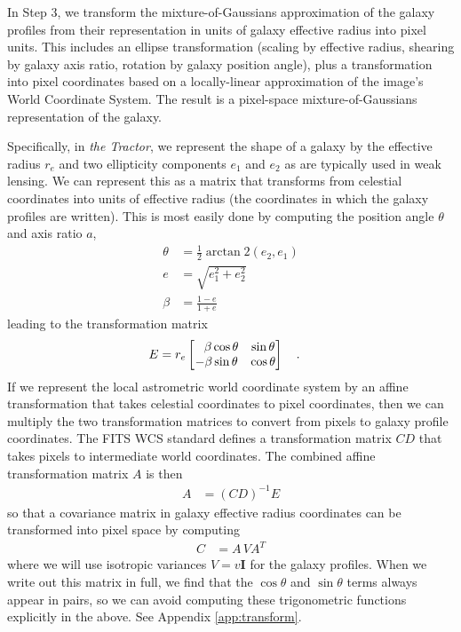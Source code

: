 \documentclass[11pt,preprint]{aastex}
\newcommand{\appref}[1]{Appendix \ref{#1}}
\newcommand{\project}[1]{\textsl{#1}}
\newcommand{\transpose}[1]{#1^{T}}
\newcommand{\CD}{C\!D}
\begin{document}
In Step 3, we transform the mixture-of-Gaussians approximation of the
galaxy profiles from their representation in units of galaxy effective
radius into pixel units.  This includes an ellipse transformation
(scaling by effective radius, shearing by galaxy axis ratio, rotation
by galaxy position angle), plus a transformation into pixel
coordinates based on a locally-linear approximation of the image's
World Coordinate System.
The result is a pixel-space mixture-of-Gaussians representation of the
galaxy.

Specifically, in \project{the Tractor}, we represent the shape of a
galaxy by the effective radius $r_e$ and two ellipticity components
$e_1$ and $e_2$ as are typically used in weak lensing.  We can
represent this as a matrix that transforms from celestial coordinates
into units of effective radius (the coordinates in which the galaxy
profiles are written).  This is most easily done by computing the
position angle $\theta$ and axis ratio $a$,
\begin{align}
%
\theta & = \frac{1}{2} \arctan\!2(e_2, e_1) \\
%
e & = \sqrt{e_1^2 + e_2^2} \\
%
\beta & = \frac{1 - e}{1 + e} \label{eq:a}
\end{align}
leading to the transformation matrix
\begin{align}
E &= r_e \begin{bmatrix}
\textcolor{white}{-}\beta \cos{\theta} & \sin{\theta} \\
-\beta \sin{\theta} & \cos{\theta} \\
\end{bmatrix} \quad .
\end{align}
If we represent the local astrometric world coordinate system by an
affine transformation that takes celestial coordinates to pixel
coordinates, then we can multiply the two transformation matrices to
convert from pixels to galaxy profile coordinates.  The FITS WCS
standard \citep{wcs2} defines a transformation matrix $\CD$ that takes
pixels to intermediate world coordinates.  The combined affine transformation
matrix $A$ is then
\begin{align}
A & = (\CD)^{-1} E
\end{align}
so that a covariance matrix in galaxy effective radius coordinates can
be transformed into pixel space by computing
\begin{align}
C &= A \, V \transpose{A}
\label{eq:vpix}
\end{align}
where we will use isotropic variances $V = v \bm{I}$ for the galaxy profiles.
When we write out this matrix in full, we find that the $\cos{\theta}$
and $\sin{\theta}$ terms always appear in pairs, so we can avoid
computing these trigonometric functions explicitly in the above.  See
\appref{app:transform}.
\end{document}
